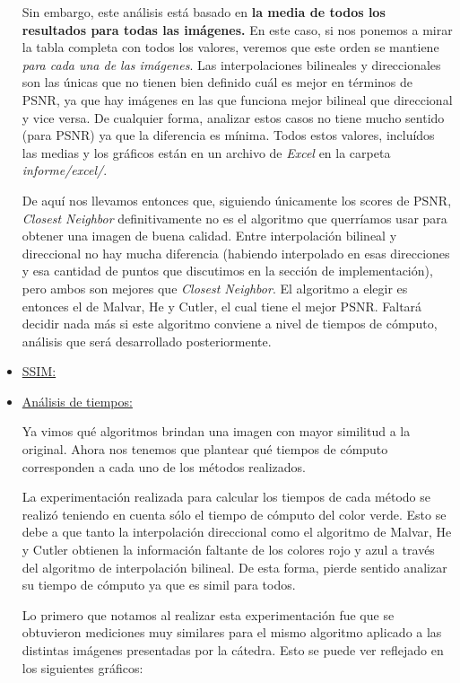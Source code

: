 \begin{itemize}
Sin embargo, este análisis está basado en \textbf{la media de todos los resultados para todas las imágenes.} En este caso, si nos ponemos a mirar la tabla completa con todos los valores, veremos que este orden se mantiene \textit{para cada una de las imágenes}. Las interpolaciones bilineales y direccionales son las únicas que no tienen bien definido cuál es mejor en términos de PSNR, ya que hay imágenes en las que funciona mejor bilineal que direccional y vice versa. De cualquier forma, analizar estos casos no tiene mucho sentido (para PSNR) ya que la diferencia es mínima. Todos estos valores, incluídos las medias y los gráficos están en un archivo de \textit{Excel} en la carpeta \textit{informe/excel/}.

\vspace{\baselineskip}

De aquí nos llevamos entonces que, siguiendo únicamente los scores de PSNR, \textit{Closest Neighbor} definitivamente no es el algoritmo que querríamos usar para obtener una imagen de buena calidad. Entre interpolación bilineal y direccional no hay mucha diferencia (habiendo interpolado en esas direcciones y esa cantidad de puntos que discutimos en la sección de implementación), pero ambos son mejores que \textit{Closest Neighbor}. El algoritmo a elegir es entonces el de Malvar, He y Cutler, el cual tiene el mejor PSNR. Faltará decidir nada más si este algoritmo conviene a nivel de tiempos de cómputo, análisis que será desarrollado posteriormente.

\item \underline{SSIM:}

\item \underline{Análisis de tiempos:}

Ya vimos qué algoritmos brindan una imagen con mayor similitud a la original. Ahora nos tenemos que plantear qué tiempos de cómputo corresponden a cada uno de los métodos realizados. 

La experimentación realizada para calcular los tiempos de cada método se realizó teniendo en cuenta sólo el tiempo de cómputo del color verde. Esto se debe a que tanto la interpolación direccional como el algoritmo de Malvar, He y Cutler obtienen la información faltante de los colores rojo y azul a través del algoritmo de interpolación bilineal. De esta forma, pierde sentido analizar su tiempo de cómputo ya que es simil para todos.

Lo primero que notamos al realizar esta experimentación fue que se obtuvieron mediciones muy similares para el mismo algoritmo aplicado a las distintas imágenes presentadas por la cátedra. Esto se puede ver reflejado en los siguientes gráficos:


\end{itemize}
